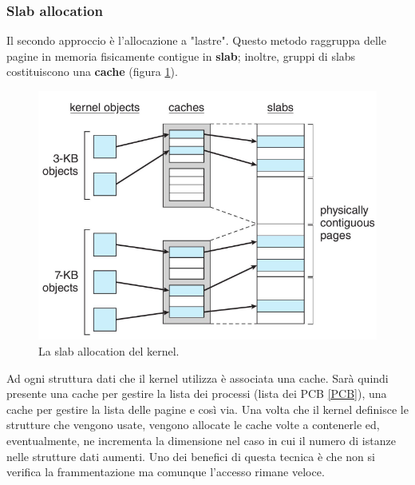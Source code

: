 \subsubsection{Slab allocation}
Il secondo approccio è l'allocazione a "lastre". Questo metodo raggruppa delle pagine in memoria fisicamente contigue in \textbf{slab}; inoltre, gruppi di slabs costituiscono una \textbf{cache} (figura \ref{fig:slab_allocation}).
\begin{figure}[h]
    \centering
    \includegraphics[width = .55\textwidth]{../res/imgs/virtual memory/slab_allocation.png}
    \caption{La slab allocation del kernel.}
    \label{fig:slab_allocation}
\end{figure}
Ad ogni struttura dati che il kernel utilizza è associata una cache. Sarà quindi presente una cache per gestire la lista dei processi (lista dei PCB \ref{PCB}), una cache per gestire la lista delle pagine e così via. Una volta che il kernel definisce le strutture che vengono usate, vengono allocate le cache volte a contenerle ed, eventualmente, ne incrementa la dimensione nel caso in cui il numero di istanze nelle strutture dati aumenti. Uno dei benefici di questa tecnica è che non si verifica la frammentazione ma comunque l'accesso rimane veloce.
